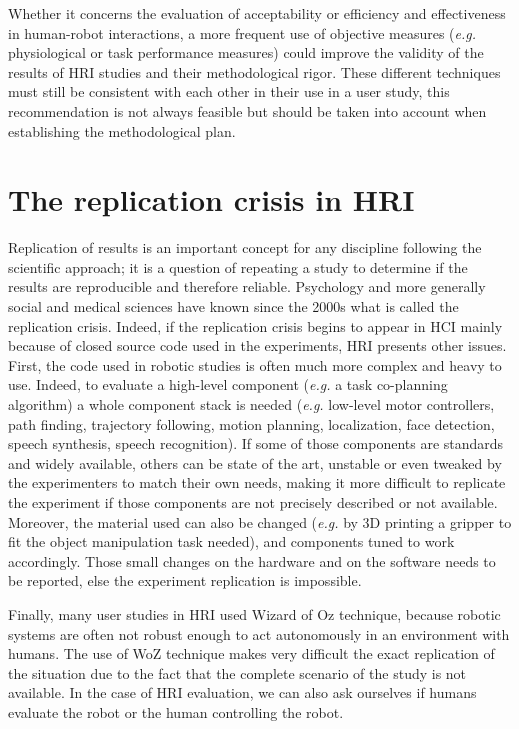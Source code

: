 \documentclass[a4paper,11pt,twoside]{StyleThese}
\begin{document}
Whether it concerns the evaluation of acceptability or efficiency and effectiveness in human-robot interactions, a more frequent use of objective measures (\textit{e.g.} physiological or task performance measures) could improve the validity of the results of HRI studies and their methodological rigor. These different techniques must still be consistent with each other in their use in a user study, this recommendation is not always feasible but should be taken into account when establishing the methodological plan.

\section{The replication crisis in HRI}
\label{sec:replication}

Replication of results is an important concept for any discipline following the scientific approach; it is a question of repeating a study to determine if the results are reproducible and therefore reliable. Psychology and more generally social and medical sciences have known since the 2000s what is called the replication crisis.
Indeed, if the replication crisis begins to appear in HCI \cite{echtler2018open} mainly because of closed source code used in the experiments, HRI presents other issues. First, the code used in robotic studies is often much more complex and heavy to use. Indeed, to evaluate a high-level component (\textit{e.g.} a task co-planning algorithm) a whole component stack is needed (\textit{e.g.} low-level motor controllers, path finding, trajectory following, motion planning, localization, face detection, speech synthesis, speech recognition). If some of those components are standards and widely available, others can be state of the art, unstable or even tweaked by the experimenters to match their own needs, making it more difficult to replicate the experiment if those components are not precisely described or not available. Moreover, the material used can also be changed (\textit{e.g.} by 3D printing a gripper to fit the object manipulation task needed), and components tuned to work accordingly. Those small changes on the hardware and on the software needs to be reported, else the experiment replication is impossible.

Finally, many user studies in HRI used Wizard of Oz technique, because robotic systems are often not robust enough to act autonomously in an environment with humans. The use of WoZ technique makes very difficult the exact replication of the situation due to the fact that the complete scenario of the study is not available. 
In the case of HRI evaluation, we can also ask ourselves if humans evaluate the robot or the human controlling the robot.
\end{document}
